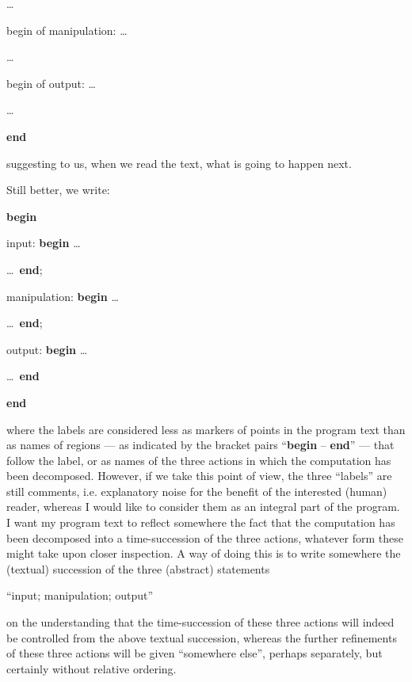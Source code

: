 \noindent
\tabto{10em} \quad\dots

\noindent
begin of manipulation:\tabto{10em} \quad\dots
\nopagebreak

\noindent
\tabto{10em} \quad\dots

\noindent
begin of output:\tabto{10em} \quad\dots
\nopagebreak

\noindent
\tabto{10em} \quad\dots

\noindent
\tabto{10em}\textbf{end}

\noindent
suggesting to us, when we read the text, what is going to happen next.

Still better, we write:

\noindent
\tabto{10em}\textbf{begin}
\nopagebreak

\noindent
input:\tabto{10em} \quad\textbf{begin} \tabto{14em}\dots
\nopagebreak

\noindent
\tabto{13em} \quad\dots\ \textbf{end};

\noindent
manipulation:\tabto{10em} \quad\textbf{begin} \tabto{14em}\dots
\nopagebreak

\noindent
\tabto{13em} \quad\dots\ \textbf{end};

\noindent
output:\tabto{10em} \quad\textbf{begin} \tabto{14em}\dots
\nopagebreak
\nopagebreak

\noindent
\tabto{13em} \quad\dots\ \textbf{end}
\nopagebreak

\noindent
\tabto{10em}\textbf{end}

\noindent
where the labels are considered less as markers of points in the program text than as names of regions --- as indicated by the bracket pairs ``\textbf{begin} -- \textbf{end}'' --- that follow the label, or as names of the three actions in which the computation has been decomposed. However, if we take this point of view, the three ``labels'' are still comments, i.e. explanatory noise for the benefit of the interested (human) reader, whereas I would like to consider them as an integral part of the program. I want my program text to reflect somewhere the fact that the computation has been decomposed into a time-succession of the three actions, whatever form these might take upon closer inspection. A way of doing this is to write somewhere the (textual) succession of the three (abstract) statements
\medskip

{
	\setlength{\parindent}{8em}
	\hspace{-.5em}``input; manipulation; output''
}
\medskip

\noindent
on the understanding that the time-succession of these three actions will indeed be controlled from the above textual succession, whereas the further refinements of these three actions will be given ``somewhere else'', perhaps separately, but certainly without relative ordering.

